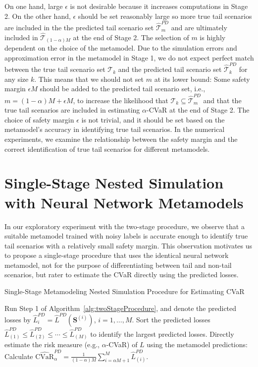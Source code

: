 \documentclass{article}
\newcommand{\CVaR}{\mbox{CVaR}}
\newcommand{\tail}{\mathcal{T}}
\newcommand{\bS}{\bm{S}}
\newcommand{\Lhat}{\widehat{L}}
\begin{document}
On one hand, large $\epsilon$ is not desirable because it increases computations in Stage 2.
On the other hand, $\epsilon$ should be set reasonably large so more true tail scenarios are included in the the predicted tail scenario set $\widehat{\tail}_{m}^{PD}$ and are ultimately included in $\widehat{\tail}_{(1-\alpha )M}$ at the end of Stage 2.
The selection of $m$ is highly dependent on the choice of the metamodel.
Due to the simulation errors and approximation error in the metamodel in Stage 1, we do not expect perfect match between the true tail scenario set $\tail_{k}$ and the predicted tail scenario set $\widehat{\tail}_{k}^{PD}$ for any size $k$.
This means that we should not set $m$ at its lower bound: Some safety margin $\epsilon M$ should be added to the predicted tail scenario set, i.e., $m = (1-\alpha )M + \epsilon M$, to increase the likelihood that $\tail_{k} \subseteq \widehat{\tail}_{m}^{PD}$ and that the true tail scenarios are included in estimating $\alpha$-CVaR at the end of Stage 2.
The choice of safety margin $\epsilon$ is not trivial, and it should be set based on the metamodel's accuracy in identifying true tail scenarios.
In the numerical experiments, we examine the relationship between the safety margin and the correct identification of true tail scenarios for different metamodels.

\section{Single-Stage Nested Simulation with Neural Network Metamodels} \label{sec:metamodel1Stage}

In our exploratory experiment with the two-stage procedure, we observe that a suitable metamodel trained with noisy labels is accurate enough to identify true tail scenarios with a relatively small safety margin.
This observation motivates us to propose a single-stage procedure that uses the identical neural network metamodel, not for the purpose of differentiating between tail and non-tail scenarios, but rater to estimate the CVaR directly using the predicted losses. 

\begin{algorithm}
\caption{Single-Stage Metamodeling Nested Simulation Procedure for Estimating CVaR}
\begin{algorithmic}[1] \label{alg:oneStageProcedure}
    \STATE Run Step 1 of Algorithm~\ref{alg:twoStageProcedure}, and denote the predicted losses by
    $\Lhat^{PD}_i = \Lhat^{PD}(\bS^{(i)})$, $i=1,\ldots,M$.
    \STATE Sort the predicted losses $\Lhat^{PD}_{(1)}\leq \Lhat^{PD}_{(2)} \leq \cdots\leq \Lhat^{PD}_{(M)}$ to identify the largest predicted losses. 
    \STATE Directly estimate the risk measure (e.g., $\alpha$-CVaR) of $L$ using the metamodel predictions: Calculate $\widehat{\CVaR}^{PD}_\alpha = \frac{1}{(1-\alpha)M} \sum_{i=\alpha M + 1}^{M}\Lhat^{PD}_{(i)}$.
\end{algorithmic}
\end{algorithm}
\end{document}
